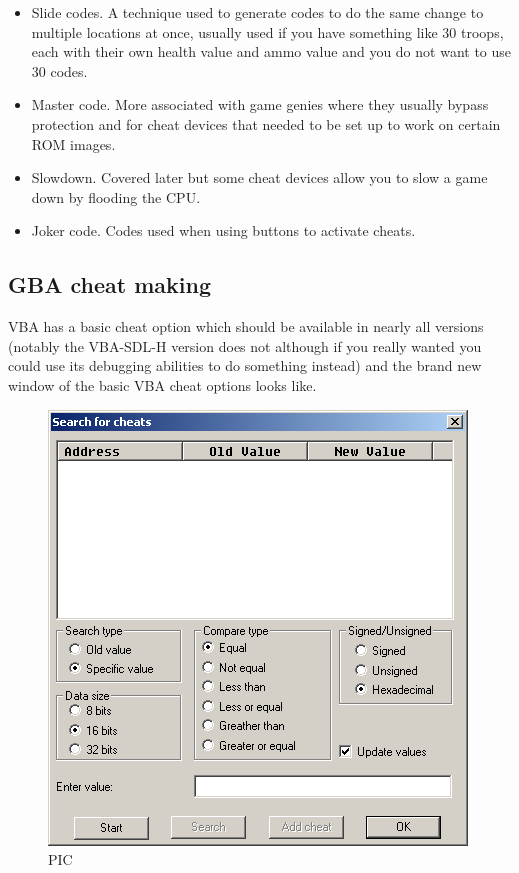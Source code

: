 \documentclass[
]{book}
\providecommand{\tightlist}{%
  \setlength{\itemsep}{0pt}\setlength{\parskip}{0pt}}
\begin{document}
\begin{itemize}
\tightlist
\item
  Slide codes. A technique used to generate codes to do the same change to multiple locations at once, usually used if you have something like 30 troops, each with their own health value and ammo value and you do not want to use 30 codes.
\item
  Master code. More associated with game genies where they usually bypass protection and for cheat devices that needed to be set up to work on certain ROM images.
\item
  Slowdown. Covered later but some cheat devices allow you to slow a game down by flooding the CPU.
\item
  Joker code. Codes used when using buttons to activate cheats.
\end{itemize}

\hypertarget{gba-cheat-making}{%
\subsection{GBA cheat making}\label{gba-cheat-making}}

VBA has a basic cheat option which should be available in nearly all versions (notably the VBA-SDL-H version does not although if you really wanted you could use its debugging abilities to do something instead) and the brand new window of the basic VBA cheat options looks like.

\begin{figure}
\centering
\includegraphics{images/194_home_fast6191_romhackingguide_unrenamed_files_and_original_borders_romhackingguideGBAcheat.png}
\caption{PIC}
\end{figure}
\end{document}
